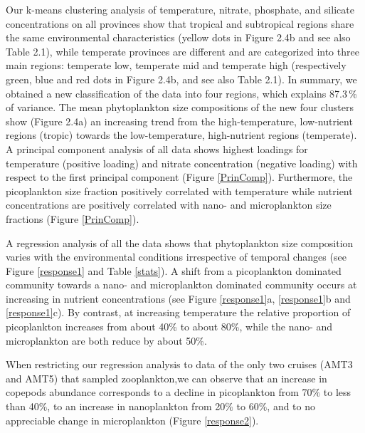 Our k-means clustering analysis of temperature, nitrate, phosphate, and silicate concentrations on all provinces show that tropical and subtropical regions share the same environmental characteristics (yellow dots in Figure 2.4b and see also Table 2.1), while temperate provinces are different and are categorized into three main regions: temperate low, temperate mid and temperate high (respectively green, blue and red dots in Figure 2.4b, and see also Table 2.1). In summary, we obtained a new classification of the data into four regions, which explains 87.3\,\% of variance. The mean phytoplankton size compositions of the new four clusters show (Figure 2.4a) an increasing trend from the high-temperature, low-nutrient regions (tropic) towards the low-temperature, high-nutrient regions (temperate). A principal component analysis of all data shows highest loadings for temperature (positive loading) and nitrate concentration (negative loading) with respect to the first principal component (Figure \ref{PrinComp}). Furthermore, the picoplankton size fraction positively correlated with temperature while nutrient concentrations are positively correlated with nano- and microplankton size fractions (Figure \ref{PrinComp}).

A regression analysis of all the data shows that phytoplankton size composition varies with the environmental conditions irrespective of temporal changes (see Figure \ref{response1} and Table \ref{stats}). A shift from a picoplankton dominated community towards a nano- and microplankton dominated community occurs at increasing in nutrient concentrations (see Figure \ref{response1}a, \ref{response1}b and \ref{response1}c). By contrast, at increasing temperature the relative proportion of picoplankton increases from about 40\% to about 80\%, while the nano- and microplankton are both reduce by about 50\%.

When restricting our regression analysis to data of the only two cruises (AMT3 and AMT5) that sampled zooplankton,we can observe that an increase in copepods abundance corresponds to a decline in picoplankton from 70$\%$ to less than 40$\%$, to an increase in nanoplankton from 20$\%$ to 60$\%$, and to no appreciable change in microplankton (Figure \ref{response2}).

